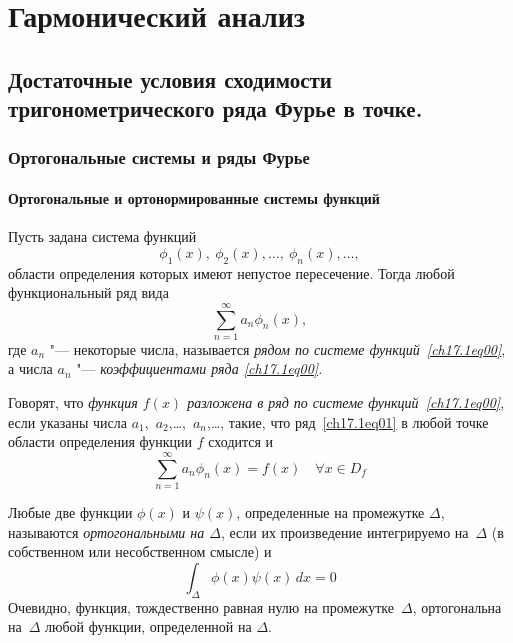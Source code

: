 \part[Гармонический анализ]{Гармонический анализ}%

\chapter{Достаточные условия сходимости тригонометрического ряда Фурье в точке.}
\section{Ортогональные системы и ряды Фурье}
\subsection{Ортогональные и ортонормированные системы функций}
Пусть задана система функций 
\begin{equation} \label{ch17.1eq00}
\phi_1(x), \ \phi_2(x),\ldots, \ \phi_n(x), \ldots,
\end{equation}
области определения которых имеют непустое пересечение. Тогда любой функциональный ряд вида
\begin{equation} \label{ch17.1eq01}
\sum_{n = 1}^{\infty} a_n \phi_n(x),
\end{equation}
где $a_n$ "--- некоторые числа, называется \textit{рядом по системе функций~\eqref{ch17.1eq00}}, а числа $a_n$ "--- \textit{коэффициентами ряда \eqref{ch17.1eq00}.}

Говорят, что \textit{функция $f(x)$ разложена в ряд по системе функций~\eqref{ch17.1eq00}}, если указаны числа $a_1$,~$a_2$,\dots,~$a_n$,\dots, такие, что ряд~\eqref{ch17.1eq01} в любой точке области определения функции $f$ сходится и 
$$
\sum_{n = 1}^{\infty} a_n \phi_n(x)=f(x) \quad \forall x \in D_f
$$ 

\begin{defn}
Любые две функции $\phi(x)$	и $\psi(x)$, определенные на промежутке $\Delta$, называются \textit{ортогональными на $\Delta$}, если их произведение интегрируемо на~$\Delta$ (в собственном или несобственном смысле) и
$$
\int_\Delta\phi(x) \psi(x)\,dx=0
$$
Очевидно, функция, тождественно равная нулю на промежутке~$\Delta$, ортогональна на~$\Delta$ любой функции, определенной на $\Delta$.
\end{defn}

